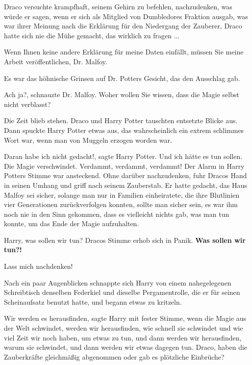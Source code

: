 Draco versuchte krampfhaft, seinem Gehirn zu befehlen, nachzudenken, was würde
er sagen, wenn er sich als Mitglied von Dumbledores Fraktion ausgab, was war
ihrer Meinung nach die Erklärung für den Niedergang der Zauberer, Draco hatte
sich nie die Mühe gemacht, das wirklich zu fragen ...

\glqq Wenn Ihnen keine andere Erklärung für meine Daten einfällt, müssen Sie
meine Arbeit veröffentlichen, Dr. Malfoy.\grqq{}

Es war das höhnische Grinsen auf Dr. Potters Gesicht, das den Ausschlag gab.

\glqq Ach ja?\grqq{}, schnauzte Dr. Malfoy. \glqq Woher wollen Sie wissen, dass
die Magie selbst nicht verblasst?\grqq{}

Die Zeit blieb stehen. Draco und Harry Potter tauschten entsetzte Blicke aus.
Dann spuckte Harry Potter etwas aus, das wahrscheinlich ein extrem schlimmes
Wort war, wenn man von Muggeln erzogen worden war.

\glqq Daran habe ich nicht gedacht!\grqq{}, sagte Harry Potter. \glqq Und ich
hätte es tun sollen. Die Magie verschwindet. Verdammt, verdammt,
verdammt!\grqq{} Der Alarm in Harry Potters Stimme war ansteckend. Ohne darüber
nachzudenken, fuhr Dracos Hand in seinen Umhang und griff nach seinem
Zauberstab. Er hatte gedacht, das Haus Malfoy sei sicher, solange man nur in
Familien einheiratete, die ihre Blutlinien vier Generationen zurückverfolgen
konnten, sollte man sicher sein, es war ihm noch nie in den Sinn gekommen, dass
es vielleicht nichts gab, was man tun konnte, um das Ende der Magie aufzuhalten.

\glqq Harry, was sollen wir tun?\grqq{} Dracos Stimme erhob sich in Panik. \glqq
\textbf{Was sollen wir tun?!}\grqq{}

\glqq Lass mich nachdenken!\grqq{}

Nach ein paar Augenblicken schnappte sich Harry von einem nahegelegenen
Schreibtisch denselben Federkiel und dieselbe Pergamentrolle, die er für seinen
Scheinaufsatz benutzt hatte, und begann etwas zu kritzeln.

\glqq Wir werden es herausfinden\grqq{}, sagte Harry mit fester Stimme, \glqq
wenn die Magie aus der Welt schwindet, werden wir herausfinden, wie schnell sie
schwindet und wie viel Zeit wir noch haben, um etwas zu tun, und dann werden wir
herausfinden, warum sie schwindet, und dann werden wir etwas dagegen tun. Draco,
haben die Zauberkräfte gleichmäßig abgenommen oder gab es plötzliche
Einbrüche?\grqq{}

